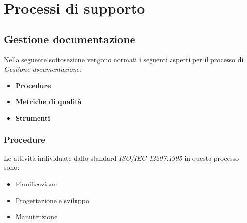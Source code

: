 \section{Processi di supporto}
\subsection{Gestione documentazione}
Nella seguente sottosezione vengono normati i seguenti aspetti per il 
processo di \textit{Gestione documentazione}:
\begin{itemize}
    \item \textbf{Procedure}
    \item \textbf{Metriche di qualità}
    \item \textbf{Strumenti}
\end{itemize}

\subsubsection{Procedure}
Le attività individuate dallo standard \textit{ISO/IEC 12207:1995} in questo processo sono:
\begin{itemize}
    \item Pianificazione
    \item Progettazione e sviluppo
    \item Manutenzione
\end{itemize}

